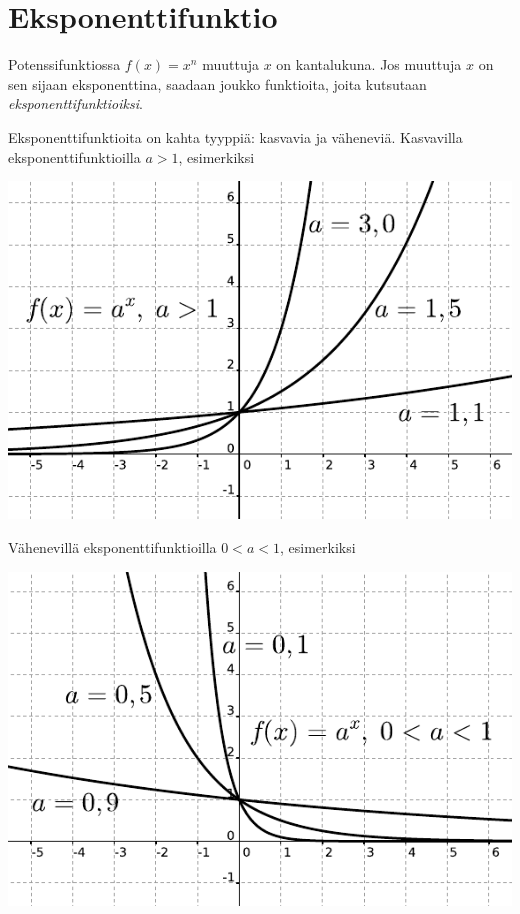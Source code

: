 \chapter{Eksponenttifunktio}

Potenssifunktiossa $f(x) = x^n$ muuttuja $x$ on kantalukuna. Jos muuttuja
$x$ on sen sijaan eksponenttina, saadaan joukko funktioita, joita
kutsutaan \emph{eksponenttifunktioiksi}.


Eksponenttifunktioita on kahta tyyppiä: kasvavia ja väheneviä.
Kasvavilla eksponenttifunktioilla $a>1$, esimerkiksi

\begin{center}
\includegraphics{03-funktiot/kuvia/apotenssiinxaisompikuinyksi.pdf}
\end{center}

Vähenevillä eksponenttifunktioilla $0<a<1$, esimerkiksi

\begin{center}
\includegraphics{03-funktiot/kuvia/apotenssiinxaisompikuinnolla.pdf}
\end{center}

